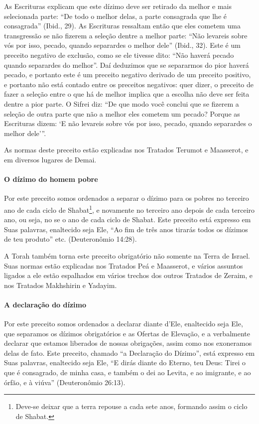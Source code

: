 As Escrituras explicam que este dízimo deve ser retirado da melhor e
mais selecionada parte: ``De todo o melhor delas, a parte consagrada que
lhe é consagrada'' (Ibid., 29). As Escrituras ressaltam então que eles
cometem uma transgressão se não fizerem a seleção dentre a melhor parte:
``Não levareis sobre vós por isso, pecado, quando separardes o melhor
dele'' (Ibid., 32). Este é um preceito negativo de exclusão, como se ele
tivesse dito: ``Não haverá pecado quando separardes do melhor''. Daí
deduzimos que se separarmos do pior haverá pecado, e portanto este é um
preceito negativo derivado de um preceito positivo, e portanto não está
contado entre os preceitos negativos: quer dizer, o preceito de fazer a
seleção entre o que há de melhor implica que a escolha não deve ser
feita dentre a pior parte. O Sifrei diz: ``De que modo você conclui que
se fizerem a seleção de outra parte que não a melhor eles cometem um
pecado? Porque as Escrituras dizem: `E não levareis sobre vós por isso,
pecado, quando separardes o melhor dele'''.

As normas deste preceito estão explicadas nos Tratados Terumot e
Maasserot, e em diversos lugares de Demai.

\paragraph{O dízimo do homem pobre}

Por este preceito somos ordenados a separar o dízimo para os pobres no
terceiro ano de cada ciclo de Shabat\footnote{Deve-se deixar que a terra repouse a cada sete anos, formando assim o
  ciclo de Shabat.}, e novamente
no terceiro ano depois de cada terceiro ano, ou seja, no se o ano de
cada ciclo de Shabat. Este preceito está expresso em Suas palavras,
enaltecido seja Ele, ``Ao fim de três anos tirarás todos os dízimos de
teu produto'' etc. (Deuteronômio 14:28).

A Torah também torna este preceito obrigatório não somente na Terra de
Israel. Suas normas estão explicadas nos Tratados Peá e Maasserot, e
vários assuntos ligados a ele estão espalhados em vários trechos dos
outros Tratados de Zeraim, e nos Tratados Makhshirin e Yadayim.

\paragraph{A declaração do dízimo}

Por este preceito somos ordenados a declarar diante d'Ele, enaltecido
seja Ele, que separamos os dízimos obrigatórios e as Ofertas de
Elevação, e a verbalmente declarar que estamos liberados de nossas
obrigações, assim como nos exoneramos delas de fato. Este preceito,
chamado ``a Declaração do Dízimo'', está expresso em Suas palavras,
enaltecido seja Ele, ``E dirás diante do Eterno, teu Deus: Tirei o que é
consagrado, de minha casa, e também o dei ao Levita, e ao imigrante, e
ao órfão, e à viúva'' (Deuteronômio 26:13).

